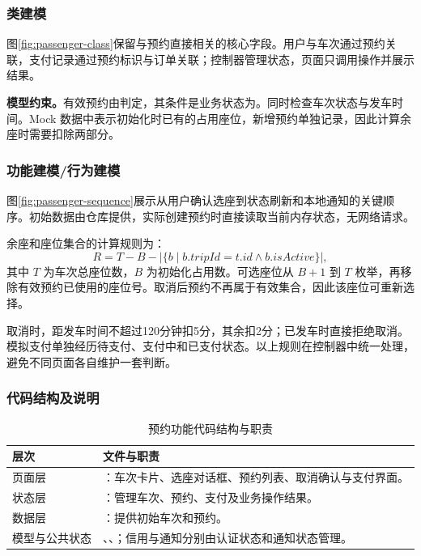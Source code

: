 \subsubsection{类建模}
图\ref{fig:passenger-class}保留与预约直接相关的核心字段。用户与车次通过预约关联，支付记录通过预约标识与订单关联；控制器管理状态，页面只调用操作并展示结果。

\noindent\textbf{模型约束。}有效预约由判定，其条件是业务状态为。同时检查车次状态与发车时间。Mock 数据中表示初始化时已有的占用座位，新增预约单独记录，因此计算余座时需要扣除两部分。

\subsubsection{功能建模/行为建模}
图\ref{fig:passenger-sequence}展示从用户确认选座到状态刷新和本地通知的关键顺序。初始数据由仓库提供，实际创建预约时直接读取当前内存状态，无网络请求。

余座和座位集合的计算规则为：
\[
 R=T-B-\left|\{b\mid b.tripId=t.id\land b.isActive\}\right|,
\]
其中 $T$ 为车次总座位数，$B$ 为初始化占用数。可选座位从 $B+1$ 到 $T$ 枚举，再移除有效预约已使用的座位号。取消后预约不再属于有效集合，因此该座位可重新选择。

取消时，距发车时间不超过120分钟扣5分，其余扣2分；已发车时直接拒绝取消。模拟支付单独经历待支付、支付中和已支付状态。以上规则在控制器中统一处理，避免不同页面各自维护一套判断。

\subsubsection{代码结构及说明}
\begin{table}[H]\centering\small
\caption{预约功能代码结构与职责}
\begin{tabularx}{\linewidth}{|P{2.1cm}|Y|}\hline
层次 & 文件与职责\\\hline
页面层 & ：车次卡片、选座对话框、预约列表、取消确认与支付界面。\\\hline
状态层 & ：管理车次、预约、支付及业务操作结果。\\\hline
数据层 & ：提供初始车次和预约。\\\hline
模型与公共状态 & 、、；信用与通知分别由认证状态和通知状态管理。\\\hline
\end{tabularx}\end{table}

